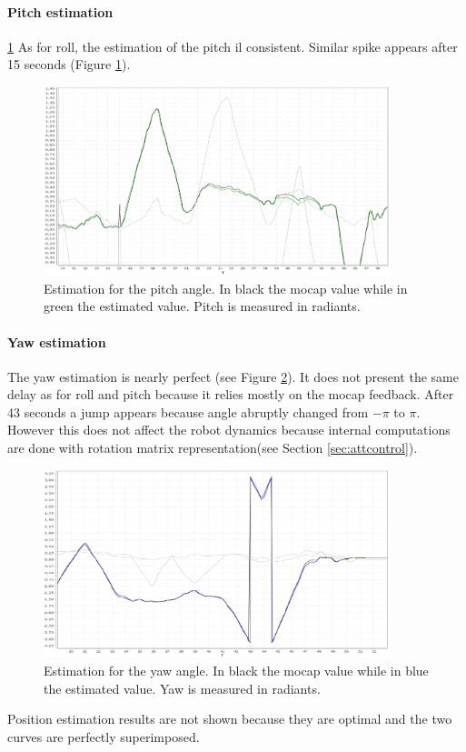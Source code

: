 \paragraph{Pitch estimation}
\ref{figure:pitchesti}
As for roll, the estimation of the pitch il consistent. Similar spike appears after 15 seconds (Figure \ref{figure:pitchesti}).

\begin{figure}[h]
	\centering
	\noindent
	\includegraphics[width=0.9\textwidth]{pitch_esti.png}
	\caption[Pitch estimation]{Estimation for the pitch angle. In black the mocap value while in green the estimated value. Pitch is measured in radiants.}
	\label{figure:pitchesti}
\end{figure}


\paragraph{Yaw estimation}

The yaw estimation is nearly perfect (see Figure \ref{figure:yawesti}). It does not present the same delay as for roll and pitch because it relies mostly on the mocap feedback. After 43 seconds a jump appears because angle abruptly changed from $-\pi$ to $\pi$. However this does not affect the robot dynamics because internal computations are done with rotation matrix representation(see Section \ref{sec:attcontrol}).

\begin{figure}[H]
	\centering
	\noindent
	\includegraphics[width=0.9\textwidth]{yaw_esti.png}
	\caption[Yaw estimation]{Estimation for the yaw angle. In black the mocap value while in blue the estimated value. Yaw is measured in radiants.}
	\label{figure:yawesti}
\end{figure}
\noindent
Position estimation results are not shown because they are optimal and the two curves are perfectly superimposed.

